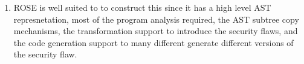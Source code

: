 \begin{enumerate}
   \item ROSE is well suited to to construct this since it has a high level AST
         represnetation, most of the program analysis required, the AST subtree copy
         mechanisms, the transformation support to introduce the security flaws, and 
         the code generation support to many different generate different versions of
         the security flaw.


\end{enumerate}
